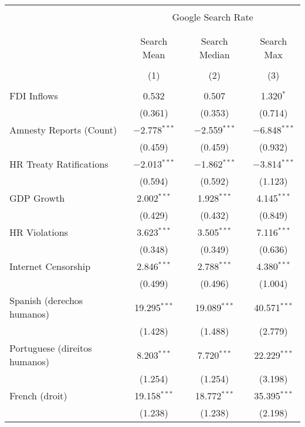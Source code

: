 
\begin{table}[!htbp] \centering 
  \caption{} 
  \label{} 
\begin{tabular}{@{\extracolsep{5pt}}lccc} 
\\[-1.8ex]\hline 
\hline \\[-1.8ex] 
 & \multicolumn{3}{c}{Google Search Rate} \\ 
\cline{2-4} 
\\[-1.8ex] & \multicolumn{3}{c}{ } \\ 
 & Search Mean & Search Median & Search Max \\ 
\\[-1.8ex] & (1) & (2) & (3)\\ 
\hline \\[-1.8ex] 
 FDI Inflows & 0.532 & 0.507 & 1.320$^{*}$ \\ 
  & (0.361) & (0.353) & (0.714) \\ 
  Amnesty Reports (Count) & $-$2.778$^{***}$ & $-$2.559$^{***}$ & $-$6.848$^{***}$ \\ 
  & (0.459) & (0.459) & (0.932) \\ 
  HR Treaty Ratifications & $-$2.013$^{***}$ & $-$1.862$^{***}$ & $-$3.814$^{***}$ \\ 
  & (0.594) & (0.592) & (1.123) \\ 
  GDP Growth & 2.002$^{***}$ & 1.928$^{***}$ & 4.145$^{***}$ \\ 
  & (0.429) & (0.432) & (0.849) \\ 
  HR Violations & 3.623$^{***}$ & 3.505$^{***}$ & 7.116$^{***}$ \\ 
  & (0.348) & (0.349) & (0.636) \\ 
  Internet Censorship & 2.846$^{***}$ & 2.788$^{***}$ & 4.380$^{***}$ \\ 
  & (0.499) & (0.496) & (1.004) \\ 
  Spanish (derechos humanos) & 19.295$^{***}$ & 19.089$^{***}$ & 40.571$^{***}$ \\ 
  & (1.428) & (1.488) & (2.779) \\ 
  Portuguese (direitos humanos) & 8.203$^{***}$ & 7.720$^{***}$ & 22.229$^{***}$ \\ 
  & (1.254) & (1.254) & (3.198) \\ 
  French (droit) & 19.158$^{***}$ & 18.772$^{***}$ & 35.395$^{***}$ \\ 
  & (1.238) & (1.238) & (2.198) \\ 

\end{tabular}
\end{table}
